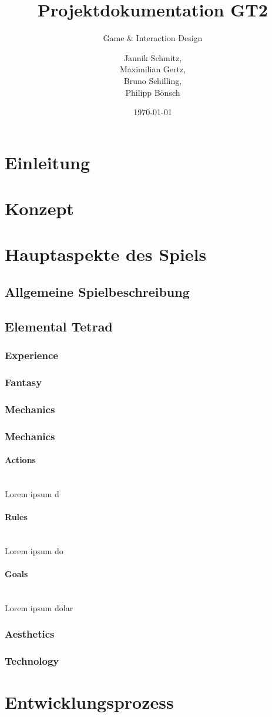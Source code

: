\documentclass[11pt]{scrartcl}
\title{Projektdokumentation GT2}
\subtitle{\vspace{2mm} Game \& Interaction Design}
\author{Jannik Schmitz,\\Maximilian Gertz,\\Bruno Schilling,\\Philipp Bönsch}
\date{\today}
\newcommand{\lbparagraph}[1]{\paragraph*{#1}\mbox{}\\}
\begin{document}
\maketitle
\lstset{basicstyle=\ttfamily\small,breaklines=true}
\tableofcontents
\newpage
\section{Einleitung}
\section{Konzept}
\section{Hauptaspekte des Spiels}
\subsection{Allgemeine Spielbeschreibung}
\subsection{Elemental Tetrad}
\subsubsection{Experience}
\subsubsection{Fantasy}
\subsubsection{Mechanics}
\subsubsection{Mechanics}
\lbparagraph{Actions}
Lorem ipsum d
\lbparagraph{Rules}
Lorem ipsum do
\lbparagraph{Goals}
Lorem ipsum dolar
\subsubsection{Aesthetics}
\subsubsection{Technology}
\section{Entwicklungsprozess}
\end{document}
